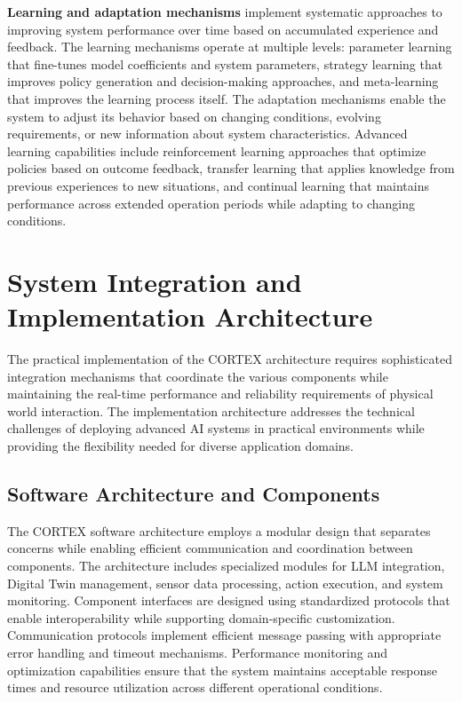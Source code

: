 \textbf{Learning and adaptation mechanisms} implement systematic approaches to improving system performance over time based on accumulated experience and feedback. The learning mechanisms operate at multiple levels: parameter learning that fine-tunes model coefficients and system parameters, strategy learning that improves policy generation and decision-making approaches, and meta-learning that improves the learning process itself. The adaptation mechanisms enable the system to adjust its behavior based on changing conditions, evolving requirements, or new information about system characteristics. Advanced learning capabilities include reinforcement learning approaches that optimize policies based on outcome feedback, transfer learning that applies knowledge from previous experiences to new situations, and continual learning that maintains performance across extended operation periods while adapting to changing conditions.

\section{System Integration and Implementation Architecture}

The practical implementation of the CORTEX architecture requires sophisticated integration mechanisms that coordinate the various components while maintaining the real-time performance and reliability requirements of physical world interaction. The implementation architecture addresses the technical challenges of deploying advanced AI systems in practical environments while providing the flexibility needed for diverse application domains.

\subsection{Software Architecture and Components}

The CORTEX software architecture employs a modular design that separates concerns while enabling efficient communication and coordination between components. The architecture includes specialized modules for LLM integration, Digital Twin management, sensor data processing, action execution, and system monitoring. Component interfaces are designed using standardized protocols that enable interoperability while supporting domain-specific customization. Communication protocols implement efficient message passing with appropriate error handling and timeout mechanisms. Performance monitoring and optimization capabilities ensure that the system maintains acceptable response times and resource utilization across different operational conditions.

